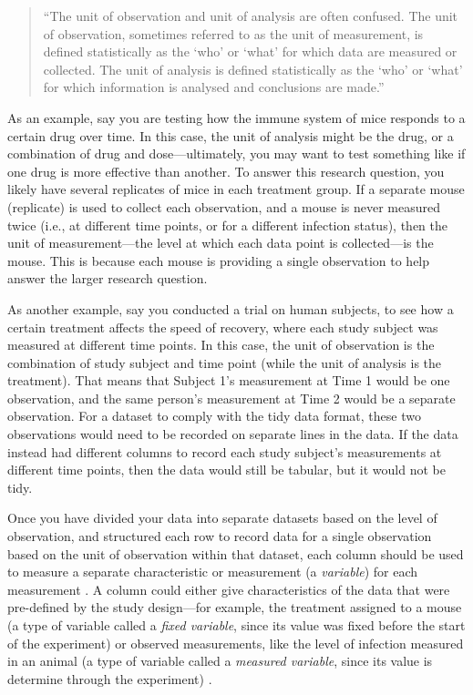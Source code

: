\documentclass[]{tufte-book}
\begin{document}
\begin{quote}
``The unit of observation and unit of analysis are often confused.
The unit of observation, sometimes referred to as the unit of
measurement, is defined statistically as the `who' or `what'
for which data are measured or collected. The unit of analysis
is defined statistically as the `who' or `what' for which
information is analysed and conclusions are made.'' \citep{sedgwick2014unit}
\end{quote}

As an example, say you are testing how the immune system of mice responds to a
certain drug over time. In this case, the unit of analysis might be the drug,
or a combination of drug and dose---ultimately, you may want to test something
like if one drug is more effective than another. To answer this research
question, you likely have several replicates of mice in each treatment group. If
a separate mouse (replicate) is used to collect each observation, and a mouse is
never measured twice (i.e., at different time points, or for a different
infection status), then the unit of measurement---the level at which each data
point is collected---is the mouse. This is because each mouse is providing a
single observation to help answer the larger research question.

As another example, say you conducted a trial on human subjects, to see how
a certain treatment affects the speed of recovery, where each study
subject was measured at different time points. In this case, the unit of
observation is the combination of study subject and time point (while the unit
of analysis is the treatment). That means that Subject 1's measurement at Time 1 would be one
observation, and the same person's measurement at Time 2 would be a separate
observation. For a dataset to comply with the tidy data format, these two
observations would need to be recorded on separate lines in the data. If the
data instead had different columns to record each study subject's measurements
at different time points, then the data would still be tabular, but it would not
be tidy.

Once you have divided your data into separate datasets based on the level of
observation, and structured each row to record data for a single observation
based on the unit of observation within that dataset, each column should be used
to measure a separate characteristic or measurement (a \emph{variable}) for each
measurement \citep{wickham2014tidy}. A column could either give characteristics of
the data that were pre-defined by the study design---for example, the treatment
assigned to a mouse (a type of variable called a \emph{fixed variable}, since its
value was fixed before the start of the experiment) or observed measurements,
like the level of infection measured in an animal (a type of variable called a
\emph{measured variable}, since its value is determine through the experiment)
\citep{wickham2014tidy}.
\end{document}
